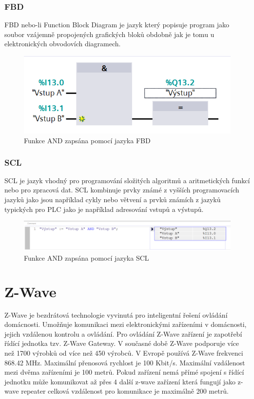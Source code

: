 \documentclass[a4paper,12pt,czech,bibliography=totoc]{scrbook}
\begin{document}
\subsubsection{FBD}
 FBD nebo-li Function Block Diagram je jazyk který popisuje program jako soubor vzájemně propojených grafických bloků obdobně jak je tomu u elektronických obvodovích diagramech. 
    	\begin{figure}[h]
    	\centering
    	\includegraphics[scale = 0.6]{FBD_AND.PNG}
    	\caption{Funkce AND zapsána pomocí jazyka FBD}
    	\label{fig:my_label}
    \end{figure}
\subsubsection{SCL}
SCL je jazyk vhodný pro programování složitých algoritmů a aritmetických funkcí nebo pro zpracová dat. SCL kombinuje prvky známé z vyšších programovacích jazyků jako jsou například cykly nebo větvení a prvků známích z jazyků typických pro PLC jako je například adresování vstupů a výstupů.
	\begin{figure}[h]
	\centering
	\includegraphics[scale = 0.6]{SCL_AND.PNG}
	\caption{Funkce AND zapsána pomocí jazyka SCL}
	\label{fig:my_label}
\end{figure}

\section{Z-Wave}
Z-Wave je bezdrátová technologie vyvinutá pro inteligentní řešení ovládání domácnosti. Umožňuje komunikaci mezi elektronickými zařízeními v domácnosti, jejich vzdálenou kontrolu a ovládání. Pro ovládání Z-Wave zařízení je zapotřebí řídící jednotka tzv. Z-Wave Gateway. V současné době Z-Wave podporuje více než 1700 výrobků od více než 450 výrobců. V Evropě používá Z-Wave frekvenci 868.42 MHz. Maximální přenosová rychlost je 100 Kbit/s. Maximální vzdálenost mezi dvěma zařízeními je 100 metrů. Pokud zařízení nemá přímé spojení s řídící jednotku může komunikovat až přes 4 další z-wave zařízení která fungují jako z-wave repeater celková vzdálenost pro komunikace je maximálně 200 metrů.
\end{document}
